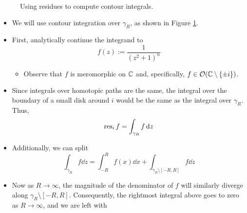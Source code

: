 \documentclass[../notes.tex]{subfiles}
\begin{document}
\begin{itemize}
\begin{figure}[h!]
        \caption{Using residues to compute contour integrals.}
        \label{fig:residueContour}
    \end{figure}
    \begin{itemize}
        \item We will use contour integration over $\gamma_R$, as shown in Figure \ref{fig:residueContour}.
        \item First, analytically continue the integrand to
        \begin{equation*}
            f(z) := \frac{1}{(z^2+1)^n}
        \end{equation*}
        \begin{itemize}
            \item Observe that $f$ is meromorphic on $\mathbb{C}$ and, specifically, $f\in\mathcal{O}(\mathbb{C}\setminus\{\pm i\})$.
        \end{itemize}
        \item Since integrals over homotopic paths are the same, the integral over the boundary of a small disk around $i$ would be the same as the integral over $\gamma_R$. Thus,
        \begin{equation*}
            \operatorname{res}_if = \int_{\gamma_R}f\dd{z}
        \end{equation*}
        \item Additionally, we can split
        \begin{equation*}
            \int_{\gamma_R}f\dd{z} = \int_{-R}^Rf(x)\dd{x}+\int_{\gamma_R^{}\setminus[-R,R]}f\dd{z}
        \end{equation*}
        \item Now as $R\to\infty$, the magnitude of the denominator of $f$ will similarly diverge along $\gamma_R\setminus[-R,R]$. Consequently, the rightmost integral above goes to zero as $R\to\infty$, and we are left with
        \begin{equation*}

\end{equation*}
\end{itemize}
\end{itemize}
\end{document}
